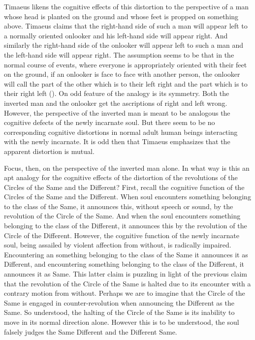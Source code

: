 Timaeus likens the cognitive effects of this distortion to the perspective of a man whose head is planted on the ground and whose feet is propped on something above. Timaeus claims that the right-hand side of such a man will appear left to a normally oriented onlooker and his left-hand side will appear right. And similarly the right-hand side of the onlooker will appear left to such a man and the left-hand side will appear right. The assumption seems to be that in the normal course of events, where everyone is appropriately oriented with their feet on the ground, if an onlooker is face to face with another person, the onlooker will call the part of the other which is to their left right and the part which is to their right left (\citealt[271]{Taylor:1928qb}). On odd feature of the analogy is its symmetry. Both the inverted man and the onlooker get the ascriptions of right and left wrong. However, the perspective of the inverted man is meant to be analogous the cognitive defects of the newly incarnate soul. But there seem to be no corresponding cognitive distortions in normal adult human beings interacting with the newly incarnate. It is odd then that Timaeus emphasizes that the apparent distortion is mutual.

Focus, then, on the perspective of the inverted man alone. In what way is this an apt analogy for the cognitive effects of the distortion of the revolutions of the Circles of the Same and the Different? First, recall the cognitive function of the Circles of the Same and the Different. When soul encounters something belonging to the class of the Same, it announces this, without speech or sound, by the revolution of the Circle of the Same. And when the soul encounters something belonging to the class of the Different, it announces this by the revolution of the Circle of the Different. However, the cognitive function of the newly incarnate soul, being assailed by violent affection from without, is radically impaired. Encountering an something belonging to the class of the Same it announces it as Different, and encountering something belonging to the class of the Different, it announces it as Same. This latter claim is puzzling in light of the previous claim that the revolution of the Circle of the Same is halted due to its encounter with a contrary motion from without. Perhaps we are to imagine that the Circle of the Same is engaged in counter-revolution when announcing the Different as the Same. So understood, the halting of the Circle of the Same is its inability to move in its normal direction alone. However this is to be understood, the soul falsely judges the Same Different and the Different Same. 

